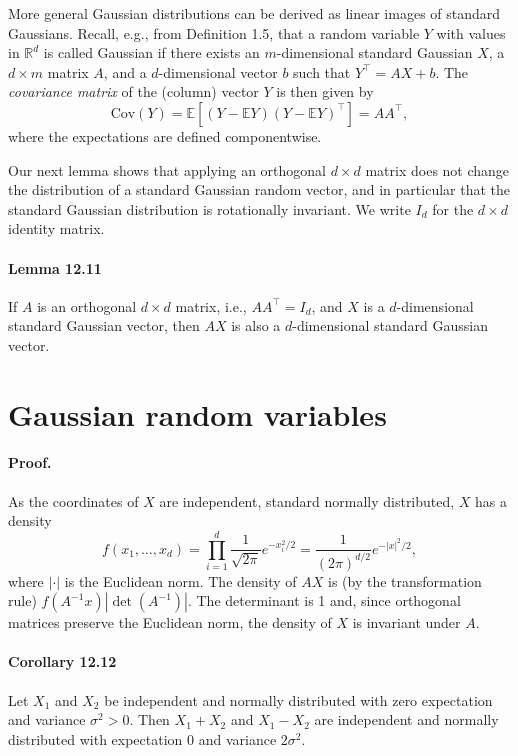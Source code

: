 \documentclass{article}
\begin{document}
More general Gaussian distributions can be derived as linear images of standard Gaussians. Recall, e.g., from Definition 1.5, that a random variable $Y$ with values in $\mathbb{R}^d$ is called Gaussian if there exists an $m$-dimensional standard Gaussian $X$, a $d \times m$ matrix $A$, and a $d$-dimensional vector $b$ such that $Y^\top = AX + b$. The \textit{covariance matrix} of the (column) vector $Y$ is then given by
\[
\text{Cov}(Y) = \mathbb{E}[(Y - \mathbb{E}Y)(Y - \mathbb{E}Y)^\top] = AA^\top,
\]
where the expectations are defined componentwise.

Our next lemma shows that applying an orthogonal $d \times d$ matrix does not change the distribution of a standard Gaussian random vector, and in particular that the standard Gaussian distribution is rotationally invariant. We write $I_d$ for the $d \times d$ identity matrix.

\paragraph{Lemma 12.11} If $A$ is an orthogonal $d \times d$ matrix, i.e., $AA^\top = I_d$, and $X$ is a $d$-dimensional standard Gaussian vector, then $AX$ is also a $d$-dimensional standard Gaussian vector.





\section*{Gaussian random variables}

\paragraph{Proof.} As the coordinates of $X$ are independent, standard normally distributed, $X$ has a density
\[
f(x_1, \ldots, x_d) = \prod_{i=1}^{d} \frac{1}{\sqrt{2\pi}} e^{-x_i^2/2} = \frac{1}{(2\pi)^{d/2}} e^{-|x|^2/2},
\]
where $| \cdot |$ is the Euclidean norm. The density of $AX$ is (by the transformation rule) $f(A^{-1}x) |\det(A^{-1})|$. The determinant is 1 and, since orthogonal matrices preserve the Euclidean norm, the density of $X$ is invariant under $A$.

\paragraph{Corollary 12.12} Let $X_1$ and $X_2$ be independent and normally distributed with zero expectation and variance $\sigma^2 > 0$. Then $X_1 + X_2$ and $X_1 - X_2$ are independent and normally distributed with expectation 0 and variance $2\sigma^2$.
\end{document}
